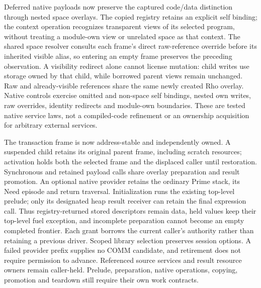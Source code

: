 \documentclass[11pt]{article}
\theoremstyle{definition}
\theoremstyle{remark}
\begin{document}
Deferred native payloads now preserve the captured code/data distinction through
nested space overlays. The copied registry retains an explicit self binding;
the context operation recognizes transparent views of its selected program,
without treating a module-own view or unrelated space as that context. The
shared space resolver consults each frame's direct raw-reference override before
its inherited visible alias, so entering an empty frame preserves the preceding
observation. A visibility redirect alone cannot license mutation: child writes
use storage owned by that child, while borrowed parent views remain unchanged.
Raw and already-visible references share the same newly created Rho overlay.
Native controls exercise omitted and non-space self bindings, nested own writes,
raw overrides, identity redirects and module-own boundaries. These are tested
native service laws, not a compiled-code refinement or an ownership acquisition
for arbitrary external services.

The transaction frame is now address-stable and independently owned. A suspended
child retains its original parent frame, including scratch resources; activation
holds both the selected frame and the displaced caller until restoration.
Synchronous and retained payload calls share overlay preparation and result
promotion. An optional native provider retains the ordinary Prime stack, its
Need episode and return traversal. Initialization runs the existing top-level
prelude; only its designated heap result receiver can retain the final expression
call. Thus registry-returned stored descriptors remain data, held values keep
their top-level fuel exception, and incomplete preparation cannot become an empty
completed frontier. Each grant borrows the current caller's authority rather
than retaining a previous driver. Scoped library selection preserves session
options. A failed provider prefix supplies no COMM candidate, and retirement
does not require permission to advance. Referenced source services and result
resource owners remain caller-held. Prelude, preparation, native operations,
copying, promotion and teardown still require their own work contracts.
\end{document}
